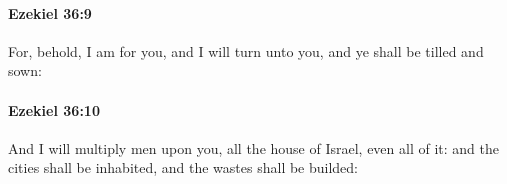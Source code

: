 		\paragraph{Ezekiel 36:9} %
			\label{EZEKIEL-36-9}

			For, behold, I am for you, and I will turn unto you, and ye shall be tilled and sown:


		\paragraph{Ezekiel 36:10} %
			\label{EZEKIEL-36-10}

			And I will multiply men upon you, all the house of Israel, even all of it: and the cities shall be inhabited, and the wastes shall be builded:


